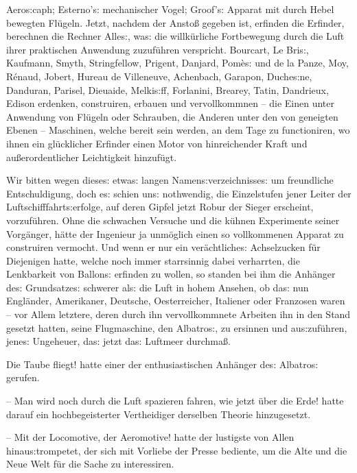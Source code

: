 \documentclass[oneside,12pt]{book}
\newcommand{\s}{s:}
\begin{document}
Aero{\s}caph; Esterno'{\s} mechanischer Vogel; Groof'{\s} Apparat mit
durch Hebel bewegten Fl\"ugeln. Jetzt, nachdem der Ansto{\ss} gegeben
ist, erfinden die Erfinder, berechnen die Rechner Alle{\s}, wa{\s}
die willk\"urliche Fortbewegung durch die Luft ihrer praktischen
Anwendung zuzuf\"uhren verspricht. Bourcart, Le Bri{\s}, Kaufmann,
Smyth, Stringfellow, Prigent, Danjard, Pom\`e{\s} und de la Panze,
Moy, R\'enaud, Jobert, Hureau de Villeneuve, Achenbach, Garapon,
Duche{\s}ne, Danduran, Parisel, Dieuaide, Melki{\s}ff, Forlanini,
Brearey, Tatin, Dandrieux, Edison erdenken, construiren, erbauen und
vervollkommnen -- die Einen unter Anwendung von Fl\"ugeln oder
Schrauben, die Anderen unter den von geneigten Ebenen -- Maschinen,
welche bereit sein werden, an dem Tage zu functioniren, wo ihnen ein
gl\"ucklicher Erfinder einen Motor von hinreichender Kraft und
au{\ss}erordentlicher Leichtigkeit hinzuf\"ugt.

Wir bitten wegen diese{\s} etwa{\s} langen Namen{\s}verzeichnisse{\s}
um freundliche Entschuldigung, doch e{\s} schien un{\s} nothwendig,
die Einzelstufen jener Leiter der Luftschifffahrt{\s}erfolge, auf
deren Gipfel jetzt Robur der Sieger erscheint, vorzuf\"uhren. Ohne
die schwachen Versuche und die k\"uhnen Experimente seiner
Vorg\"anger, h\"atte der Ingenieur ja unm\"oglich einen so
vollkommenen Apparat zu construiren vermocht. Und wenn er nur ein
ver\"achtliche{\s} Achselzucken f\"ur Diejenigen hatte, welche noch
immer starrsinnig dabei verharrten, die Lenkbarkeit von Ballon{\s}
erfinden zu wollen, so standen bei ihm die Anh\"anger de{\s}
Grundsatze{\s} {\glqq}schwerer al{\s} die Luft{\grqq} in hohem
Ansehen, ob da{\s} nun Engl\"ander, Amerikaner, Deutsche,
Oesterreicher, Italiener oder Franzosen waren -- vor Allem letztere,
deren durch ihn vervollkommnete Arbeiten ihn in den Stand gesetzt
hatten, seine Flugmaschine, den {\glqq}Albatro{\s}{\grqq}, zu
ersinnen und au{\s}zuf\"uhren, jene{\s} Ungeheuer, da{\s} jetzt
da{\s} Luftmeer durchma{\ss}.

{\glqq}Die Taube fliegt! hatte einer der enthusiastischen Anh\"anger
de{\s} {\glqq}Albatro{\s}{\grqq} gerufen.

-- Man wird noch durch die Luft spazieren fahren, wie jetzt \"uber
die Erde! hatte darauf ein hochbegeisterter Vertheidiger derselben
Theorie hinzugesetzt.

-- Mit der Locomotive, der Aeromotive!{\grqq} hatte der lustigste von
Allen hinau{\s}trompetet, der sich mit Vorliebe der Presse bediente,
um die Alte und die Neue Welt f\"ur die Sache zu interessiren.
\end{document}

